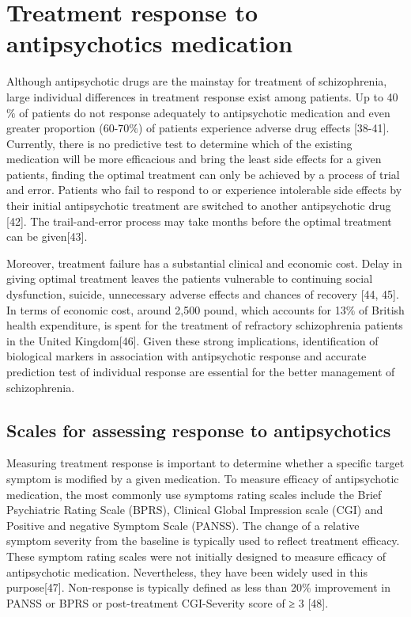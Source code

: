 \documentclass[12pt]{report}
\begin{document}
			\section{Treatment response to antipsychotics medication}
				Although antipsychotic drugs are the mainstay for treatment of schizophrenia, large individual differences in treatment response exist among patients. 
				Up to 40$\%$ of patients do not response adequately to antipsychotic medication and even greater proportion (60-70$\%$) of patients experience adverse drug effects [38-41]. 
				Currently, there is no predictive test to determine which of the existing medication will be more efficacious and bring the least side effects for a given patients, finding the optimal treatment can only be achieved by a process of trial and error. 
				Patients who fail to respond to or experience intolerable side effects by their initial antipsychotic treatment are switched to another antipsychotic drug [42]. 
				The trail-and-error process may take months before the optimal treatment can be given[43].
				
				Moreover, treatment failure has a substantial clinical and economic cost. 
				Delay in giving optimal treatment leaves the patients vulnerable to continuing social dysfunction, suicide, unnecessary adverse effects and chances of recovery [44, 45]. 
				In terms of economic cost, around 2,500 pound, which accounts for 13$\%$ of British health expenditure, is spent for the treatment of refractory schizophrenia patients in the United Kingdom[46]. 
				Given these strong implications, identification of biological markers in association with antipsychotic response and accurate prediction test of individual response are essential for the better management of schizophrenia. 
			\subsection{Scales for assessing response to antipsychotics}
				Measuring treatment response is important to determine whether a specific target symptom is modified by a given medication. 
				To measure efficacy of antipsychotic medication, the most commonly use symptoms rating scales include the Brief Psychiatric Rating Scale (BPRS), Clinical Global Impression scale (CGI) and Positive and negative Symptom Scale (PANSS).  
				The change of a relative symptom severity from the baseline is typically used to reflect treatment efficacy.
				These symptom rating scales were not initially designed to measure efficacy of antipsychotic medication.
				Nevertheless, they have been widely used in this purpose[47]. 
				Non-response is typically defined as less than 20$\%$ improvement in PANSS or BPRS or post-treatment CGI-Severity score of ≥ 3 [48]. 
\end{document}
